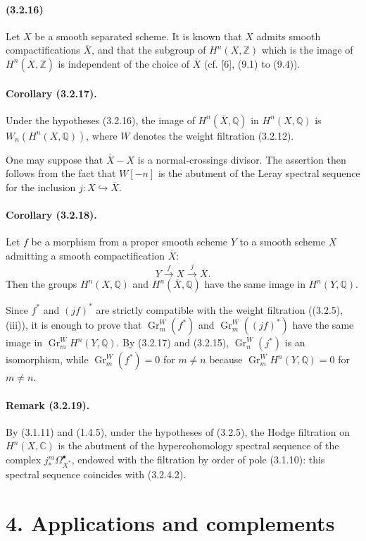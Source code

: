 \documentclass[10pt]{article}
\newcommand{\C}{\mathbb C}
\newcommand{\Q}{\mathbb Q}
\newcommand{\Z}{\mathbb Z}
\newcommand{\Gr}{\operatorname{Gr}}
\begin{document}
\paragraph{(3.2.16)} Let $X$ be a smooth separated scheme. It is known that $X$ admits smooth compactifications $\overline X$, and that the subgroup of $H^n(X,\Z)$ which is the image of $H^n(\overline X,\Z)$ is independent of the choice of $\overline X$ (cf. [6], (9.1) to (9.4)).

\paragraph{Corollary (3.2.17).} Under the hypotheses (3.2.16), the image of $H^n(\overline X,\Q)$ in $H^n(X,\Q)$ is $W_n(H^n(X,\Q))$, where $W$ denotes the weight filtration (3.2.12).

One may suppose that $\overline X-X$ is a normal-crossings divisor. The assertion then follows from the fact that $W[-n]$ is the abutment of the Leray spectral sequence for the inclusion $j:X\hookrightarrow\overline X$.

\paragraph{Corollary (3.2.18).} Let $f$ be a morphism from a proper smooth scheme $Y$ to a smooth scheme $X$ admitting a smooth compactification $\overline X$:
\[
Y\xrightarrow{f}X\xrightarrow{j}\overline X.
\]
Then the groups $H^n(X,\Q)$ and $H^n(\overline X,\Q)$ have the same image in $H^n(Y,\Q)$.

Since $f^*$ and $(jf)^*$ are strictly compatible with the weight filtration ((3.2.5), (iii)), it is enough to prove that $\Gr_m^W(f^*)$ and $\Gr_m^W((jf)^*)$ have the same image in $\Gr_m^W H^n(Y,\Q)$. By (3.2.17) and (3.2.15), $\Gr_n^W(j^*)$ is an isomorphism, while $\Gr_m^W(f^*)=0$ for $m\ne n$ because $\Gr_m^W H^n(Y,\Q)=0$ for $m\ne n$.

\paragraph{Remark (3.2.19).} By (3.1.11) and (1.4.5), under the hypotheses of (3.2.5), the Hodge filtration on $H^n(X,\C)$ is the abutment of the hypercohomology spectral sequence of the complex $j_*^m\Omega_{X^*}^{\bullet}$, endowed with the filtration by order of pole (3.1.10): this spectral sequence coincides with (3.2.4.2).

\section*{4. Applications and complements}
\end{document}
